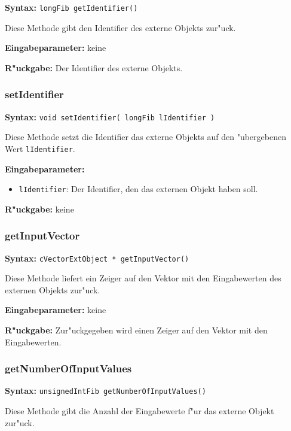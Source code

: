\textbf{Syntax:} \verb|longFib getIdentifier()|

\bigskip\noindent
Diese Methode gibt den Identifier des externe Objekts zur"uck.

\bigskip\noindent
\textbf{Eingabeparameter:} keine

\bigskip\noindent
\textbf{R"uckgabe:} Der Identifier des externe Objekts.


\subsubsection{setIdentifier}

\textbf{Syntax:} \verb|void setIdentifier( longFib lIdentifier )|

\bigskip\noindent
Diese Methode setzt die Identifier das externe Objekts auf den "ubergebenen Wert \verb|lIdentifier|.

\bigskip\noindent
\textbf{Eingabeparameter:}
\begin{itemize}
 \item \verb|lIdentifier|: Der Identifier, den das externen Objekt haben soll.
\end{itemize}

\bigskip\noindent
\textbf{R"uckgabe:} keine


\subsubsection{getInputVector}

\textbf{Syntax:} \verb|cVectorExtObject * getInputVector()|

\bigskip\noindent
Diese Methode liefert ein Zeiger auf den Vektor mit den Eingabewerten des externen Objekts zur"uck.

\bigskip\noindent
\textbf{Eingabeparameter:} keine

\bigskip\noindent
\textbf{R"uckgabe:} Zur"uckgegeben wird einen Zeiger auf den Vektor mit den Eingabewerten.


\subsubsection{getNumberOfInputValues}

\textbf{Syntax:} \verb|unsignedIntFib getNumberOfInputValues()|

\bigskip\noindent
Diese Methode gibt die Anzahl der Eingabewerte f"ur das externe Objekt zur"uck.

